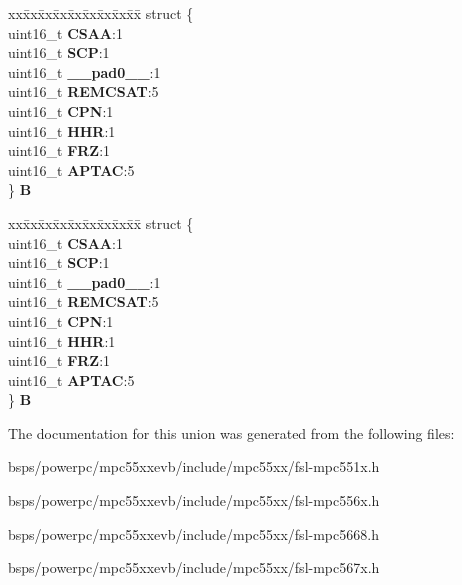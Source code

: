 \begin{DoxyCompactItemize}
\begin{tabbing}
\end{tabbing}\item 
\mbox{\label{unionuPSR1_a7a8635c865c23163bbcd24e0936c191c}} 
\begin{tabbing}
xx\=xx\=xx\=xx\=xx\=xx\=xx\=xx\=xx\=\kill
struct \{\\
\>uint16\_t {\bfseries CSAA}:1\\
\>uint16\_t {\bfseries SCP}:1\\
\>uint16\_t {\bfseries \_\_pad0\_\_}:1\\
\>uint16\_t {\bfseries REMCSAT}:5\\
\>uint16\_t {\bfseries CPN}:1\\
\>uint16\_t {\bfseries HHR}:1\\
\>uint16\_t {\bfseries FRZ}:1\\
\>uint16\_t {\bfseries APTAC}:5\\
\} {\bfseries B}\\

\end{tabbing}\item 
\mbox{\label{unionuPSR1_ac1b21f8646d1952e19b1af8c647041b2}} 
\begin{tabbing}
xx\=xx\=xx\=xx\=xx\=xx\=xx\=xx\=xx\=\kill
struct \{\\
\>uint16\_t {\bfseries CSAA}:1\\
\>uint16\_t {\bfseries SCP}:1\\
\>uint16\_t {\bfseries \_\_pad0\_\_}:1\\
\>uint16\_t {\bfseries REMCSAT}:5\\
\>uint16\_t {\bfseries CPN}:1\\
\>uint16\_t {\bfseries HHR}:1\\
\>uint16\_t {\bfseries FRZ}:1\\
\>uint16\_t {\bfseries APTAC}:5\\
\} {\bfseries B}\\

\end{tabbing}\end{DoxyCompactItemize}


The documentation for this union was generated from the following files\+:\begin{DoxyCompactItemize}
\item 
bsps/powerpc/mpc55xxevb/include/mpc55xx/fsl-\/mpc551x.\+h\item 
bsps/powerpc/mpc55xxevb/include/mpc55xx/fsl-\/mpc556x.\+h\item 
bsps/powerpc/mpc55xxevb/include/mpc55xx/fsl-\/mpc5668.\+h\item 
bsps/powerpc/mpc55xxevb/include/mpc55xx/fsl-\/mpc567x.\+h\end{DoxyCompactItemize}
